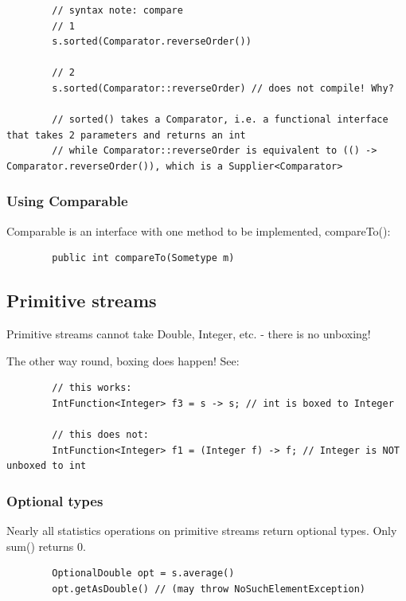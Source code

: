 \documentclass{scrartcl}
\begin{document}
    \begin{lstlisting}
        // syntax note: compare
        // 1
        s.sorted(Comparator.reverseOrder())

        // 2
        s.sorted(Comparator::reverseOrder) // does not compile! Why?

        // sorted() takes a Comparator, i.e. a functional interface that takes 2 parameters and returns an int
        // while Comparator::reverseOrder is equivalent to (() -> Comparator.reverseOrder()), which is a Supplier<Comparator>
    \end{lstlisting}

\subsubsection{Using Comparable}

    Comparable is an interface with one method to be implemented, compareTo():

    \begin{lstlisting}
        public int compareTo(Sometype m)
    \end{lstlisting}

\subsection{Primitive streams}

    Primitive streams cannot take Double, Integer, etc. - there is no unboxing!

    The other way round, boxing does happen! See:

    \begin{lstlisting}
        // this works:
        IntFunction<Integer> f3 = s -> s; // int is boxed to Integer

        // this does not:
        IntFunction<Integer> f1 = (Integer f) -> f; // Integer is NOT unboxed to int
    \end{lstlisting}

\subsubsection{Optional types}

    Nearly all statistics operations on primitive streams return optional types.
    Only sum() returns 0.

    \begin{lstlisting}
        OptionalDouble opt = s.average()
        opt.getAsDouble() // (may throw NoSuchElementException)
    \end{lstlisting}
\end{document}
